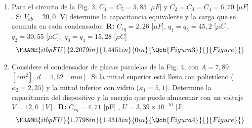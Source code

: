 \documentclass{article}
\begin{document}
\begin{enumerate}
\item Para el circuito de la Fig. 3, $C_{1}=C_{5}=5,85$ [$\mu F$] y $%
C_{2}=C_{3}=C_{4}=6,70$ [$\mu F$]$.$ Si $V_{ab}=20,0$ [V] determine la
capacitancia equivalente y la carga que se acumula en cada condensador. 
\textbf{R: }$C_{eq}=2,26$ [$\mu F$], $q_{1}=q_{5}=45,2$ [$\mu C$], $%
q_{2}=30,55$ [$\mu C$]$,$ $q_{3}=q_{4}=15,28$ [$\mu C$] 
\begin{equation*}
\FRAME{itbpFU}{2.2079in}{1.4451in}{0in}{\Qcb{Figura 3}}{}{Figure}{\special%
{language "Scientific Word";type "GRAPHIC";maintain-aspect-ratio
TRUE;display "USEDEF";valid_file "T";width 2.2079in;height 1.4451in;depth
0in;original-width 7.3794in;original-height 4.817in;cropleft "0";croptop
"1";cropright "1";cropbottom "0";tempfilename
'R23O0G03.wmf';tempfile-properties "XPR";}}
\end{equation*}

\item Considere el condensador de placas paralelas de la Fig. 4, con $A=7,89$
$[cm^{2}]$, $d=4,62$ $[mm]$. Si la mitad superior est\'{a} llena con
polietileno ($\kappa _{2}=2,25$) y la mitad inferior con vidrio ($\kappa
_{1}=5,1$)$.$ Determine la capacitancia del dispositivo y la energ\'{\i}a
que puede almacenar con un voltaje $V=12,0$ $[V].$ \textbf{R: }$C_{eq}=4,71$
[pF] , $U=3,39\times 10^{-10}$ [J] 
\begin{equation*}
\FRAME{itbpFU}{1.7798in}{1.4313in}{0in}{\Qcb{Figura 4}}{}{Figure}{\special%
{language "Scientific Word";type "GRAPHIC";maintain-aspect-ratio
TRUE;display "USEDEF";valid_file "T";width 1.7798in;height 1.4313in;depth
0in;original-width 5.1249in;original-height 4.1182in;cropleft "0";croptop
"1";cropright "1";cropbottom "0";tempfilename
'R23O0H04.wmf';tempfile-properties "XPR";}}
\end{equation*}
\end{enumerate}
\end{document}
